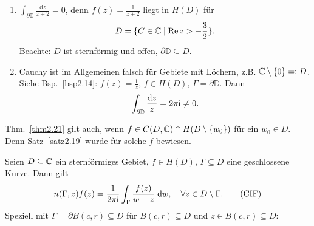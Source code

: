 \documentclass[a4paper,twoside,DIV15,BCOR12mm]{scrbook}
\begin{document}
\begin{bsp}
  \begin{enumerate}
  \item $\displaystyle\int_{\partial\mathbb{D}}{\frac{\mathrm{d}z}{z+2}}=0$, denn $f(z)=\frac{1}{z+2}$ liegt in $H(D)$ für
    \[D=\{C\in\mathbb{C} \mid \operatorname{Re}{z} > -\frac32\}.\] Beachte: $D$ ist sternförmig und offen, $\partial\mathbb{D}\subseteq D$.
  \item Cauchy ist im Allgemeinen falsch für Gebiete mit Löchern, z.B. $\mathbb{C}\setminus\{0\}=: D$. Siehe Bsp.~\ref{bsp2.14}:
    $f(z)=\frac1z$, $f\in H(D)$, $\Gamma=\partial\mathbb{D}$. Dann \[\int_{\partial\mathbb{D}}{\frac{\mathrm{d}z}{z}} = 2\pi\mathrm{i}
    \neq 0.\]
  \end{enumerate}
\end{bsp}

\begin{bem*}
  Thm.~\ref{thm2.21} gilt auch, wenn $f\in C(D,\mathbb{C}) \cap H(D\setminus\{w_0\})$ für ein $w_0\in D$. Denn Satz~\ref{satz2.19} wurde
  für solche $f$ bewiesen.
\end{bem*}

\begin{thm}
  Seien $D\subseteq\mathbb{C}$ ein sternförmiges Gebiet, $f\in H(D)$, $\Gamma\subseteq D$ eine geschlossene Kurve. Dann gilt
  \begin{equation} \label{CIF}
    n(\Gamma,z) f(z) = \frac{1}{2\pi\mathrm{i}} \int_{\Gamma}^{}{\frac{f(z)}{w-z}}\;\mathrm{d} w, \quad \forall z\in D\setminus\Gamma.
    \tag{CIF}
  \end{equation}
  Speziell mit $\Gamma=\partial B(c,r)\subseteq D$ für $B(c,r)\subseteq D$ und $z\in B(c,r)\subseteq D$:
\end{thm}

\end{document}
